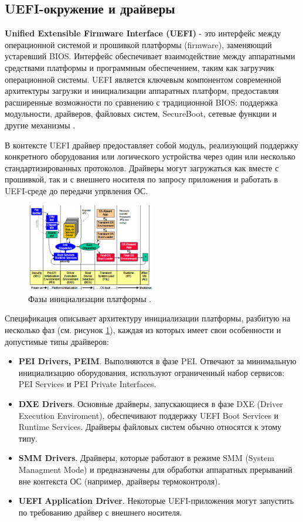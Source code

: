 \subsection{UEFI-окружение и драйверы}
\textbf{Unified Extensible Firmware Interface (UEFI)} - это интерфейс между операционной системой и прошивкой платформы (firmware), заменяющий устаревший BIOS.  Интерфейс обеспечивает взаимодействие между аппаратными средствами платформы и программным обеспечением, таким как загрузчик операционной системы. UEFI является ключевым компонентом современной архитектуры загрузки и инициализации аппаратных платформ, предоставляя расширенные возможности по сравнению с традиционной BIOS: поддержка модульности, драйверов, файловых систем, SecureBoot, сетевые функции и другие механизмы \cite{UEFISpec}.

В контексте UEFI драйвер предоставляет собой модуль, реализующий поддержку конкретного оборудования или логического устройства через один или несколько стандартизированных протоколов. Драйверы могут загружаться как вместе с прошивкой, так и с внешнего носителя по запросу приложения и работать в UEFI-среде до передачи упрвления ОС.

\begin{figure}[htbp]
	\centering %
	\includegraphics[width=0.5\textwidth]{piphases.png} %
	\caption{Фазы инициализации платформы \cite{UEFIPI}.} %
	\label{intro:piphases} %
\end{figure}
Спецификация \cite{UEFIPI} описывает архитектуру инициализации платформы, разбитую на несколько фаз (см. рисунок \ref{intro:piphases}), каждая из которых имеет свои особенности и допустимые типы драйверов:
\begin{itemize}
	\item \textbf{PEI Drivers, PEIM}. Выполняются в фазе PEI. Отвечают за минимальную инициализацию оборудования, используют ограниченный набор сервисов: PEI Services и PEI Private Interfaces.
	\item \textbf{DXE Drivers}. Основные драйверы, запускающиеся в фазе DXE (Driver Execution Enviroment), обеспечивают поддержку UEFI Boot Services и Runtime Services. Драйверы файловых систем обычно относятся к этому типу.
	\item \textbf{SMM Drivers}. Драйверы, которые работают в режиме SMM (System Managment Mode) и предназначены для обработки аппаратных прерываний вне контекста ОС (например, драйверы термоконтроля).
	\item \textbf{UEFI Application Driver}. Некоторые UEFI-приложения могут запустить по требованию драйвер с внешнего носителя.
\end{itemize} 

